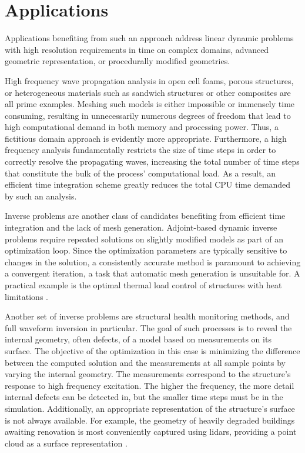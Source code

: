 %
\section{Applications}
\label{section:applications}
%

Applications benefiting from such an approach address linear dynamic problems with high resolution requirements in time on complex domains, advanced geometric representation, or procedurally modified geometries.

High frequency wave propagation analysis in open cell foams, porous structures, or heterogeneous materials such as sandwich structures or other composites \cite{Joulaian2014} are all prime examples. Meshing such models is either impossible or immensely time consuming, resulting in unnecessarily numerous degrees of freedom that lead to high computational demand in both memory and processing power. Thus, a fictitious domain approach is evidently more appropriate. Furthermore, a high frequency analysis fundamentally restricts the size of time steps in order to correctly resolve the propagating waves, increasing the total number of time steps that constitute the bulk of the process' computational load. As a result, an efficient time integration scheme greatly reduces the total CPU time demanded by such an analysis.

Inverse problems are another class of candidates benefiting from efficient time integration and the lack of mesh generation. Adjoint-based dynamic inverse problems require repeated solutions on slightly modified models as part of an optimization loop. Since the optimization parameters are typically sensitive to changes in the solution, a consistently accurate method is paramount to achieving a convergent iteration, a task that automatic mesh generation is unsuitable for. A practical example is the optimal thermal load control of structures with heat limitations \cite{Alifanov1979}.

Another set of inverse problems are structural health monitoring methods, and full waveform inversion in particular. The goal of such processes is to reveal the internal geometry, often defects, of a model based on measurements on its surface. The objective of the optimization in this case is minimizing the difference between the computed solution and the measurements at all sample points by varying the internal geometry. The measurements correspond to the structure's response to high frequency excitation. The higher the frequency, the more detail internal defects can be detected in, but the smaller time steps must be in the simulation. Additionally, an appropriate representation of the structure's surface is not always available. For example, the geometry of heavily degraded buildings awaiting renovation is most conveniently captured using lidars, providing a point cloud as a surface representation \cite{Kudela2019}.

